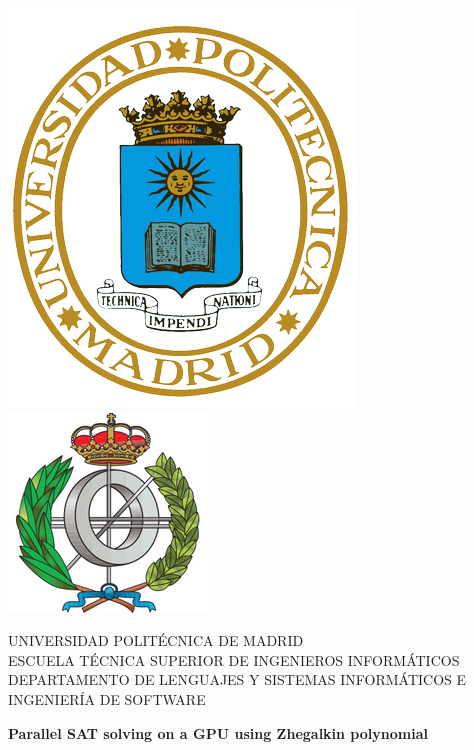 \begin{titlepage}
    \begin{center}
        \includegraphics[width=0.15\textheight]{logo.png}\hspace{1em}
        \includegraphics[width=0.165\textheight]{ets.png}\\

        \vspace{1em}

        {\large UNIVERSIDAD POLITÉCNICA DE MADRID}\\
        ESCUELA TÉCNICA SUPERIOR DE INGENIEROS INFORMÁTICOS\\
        DEPARTAMENTO DE LENGUAJES Y SISTEMAS INFORMÁTICOS E INGENIERÍA DE SOFTWARE

        \vspace{5.5em}

        \textbf{Parallel SAT solving on a GPU using Zhegalkin polynomial}

        \vspace{5.5em}


\end{center}
\end{titlepage}
